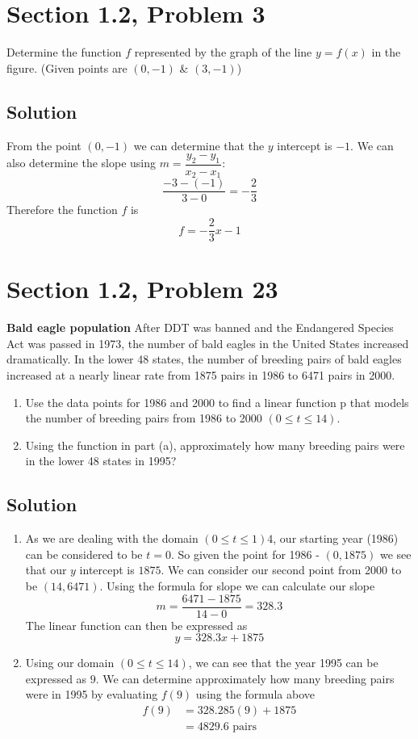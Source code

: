 \documentclass{article}
\newcommand{\problem}[2]{\vspace{5ex}\section*{Section #1, Problem #2}}
\newcommand{\solution}{\subsection*{Solution}}
\begin{document}
\problem{1.2}{3}
Determine the function $f$ represented by the graph of the line $y = f(x)$ in the figure.
(Given points are $(0, -1)$ \& $(3, -1)$)

\solution{}
From the point $(0, -1)$ we can determine that the $y$ intercept is $-1$. We can also determine the
slope using $m = \dfrac{y_2 - y_1}{x_2 - x_1}$:
\[
  \frac{-3 - (-1)}{3 - 0} = -\frac{2}{3}
\]
Therefore the function $f$ is
\[
  f = -\frac{2}{3}x - 1
\]

\problem{1.2}{23}
\textbf{Bald eagle population} After DDT was banned and the Endangered Species Act was passed in
1973, the number of bald eagles in the United States increased dramatically. In the lower 48 states,
the number of breeding pairs of bald eagles increased at a nearly linear rate from 1875 pairs in
1986 to 6471 pairs in 2000.

\begin{enumerate}[label=\textbf{\alph*. }]
  \item Use the data points for 1986 and 2000 to find a linear function p that models the number of
    breeding pairs from 1986 to 2000 $(0 \leq t \leq 14)$.
  \item Using the function in part (a), approximately how many breeding pairs were in the lower 48
    states in 1995?
\end{enumerate}

\solution{}
\begin{enumerate}[label=\textbf{\alph*. }]
\item
  As we are dealing with the domain $(0 \leq t \leq 1)4$, our starting year (1986) can be considered
  to be $t = 0$. So given the point for 1986 \-- $(0, 1875)$ we see that our $y$ intercept is
  $1875$. We can consider our second point from 2000 to be $(14, 6471)$. Using the formula for slope
  we can calculate our slope
  \[
    m = \frac{6471 - 1875}{14 - 0} = 328.3
  \]
  The linear function can then be expressed as
  \[
    y = 328.3x + 1875
  \]

\item
  Using our domain $(0 \leq t \leq 14)$, we can see that the year 1995 can be expressed as $9$.
  We can determine approximately how many breeding pairs were in 1995 by evaluating $f(9)$ using the
  formula above
  \begin{align*}
    f(9) &= 328.285(9) + 1875 \\
         &= 4829.6 \text{ pairs}
  \end{align*}
\end{enumerate}
\end{document}
